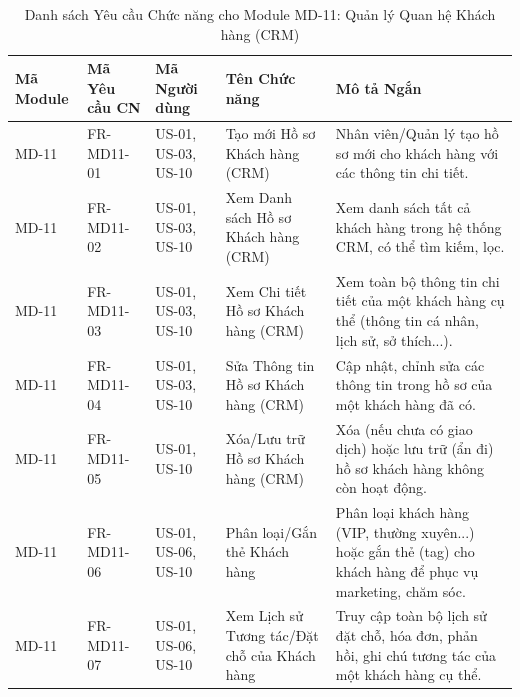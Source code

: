 \begin{longtable}{|m{2cm}|m{2.5cm}|m{2.5cm}|m{4.5cm}|m{4cm}|}
\caption{Danh sách Yêu cầu Chức năng cho Module MD-11: Quản lý Quan hệ Khách hàng (CRM)} \label{tab:fr_md11_crm_marketing_revised_in_codeblock} \\
\hline
\textbf{Mã Module} & \textbf{Mã Yêu cầu CN} & \textbf{Mã Người dùng} & \textbf{Tên Chức năng} & \textbf{Mô tả Ngắn} \\
\hline
\endhead %
\midrule
\endfoot %
\bottomrule
\endlastfoot %

MD-11 & FR-MD11-01 & US-01, US-03, US-10 & Tạo mới Hồ sơ Khách hàng (CRM) & Nhân viên/Quản lý tạo hồ sơ mới cho khách hàng với các thông tin chi tiết. \\
\hline
MD-11 & FR-MD11-02 & US-01, US-03, US-10 & Xem Danh sách Hồ sơ Khách hàng (CRM) & Xem danh sách tất cả khách hàng trong hệ thống CRM, có thể tìm kiếm, lọc. \\
\hline
MD-11 & FR-MD11-03 & US-01, US-03, US-10 & Xem Chi tiết Hồ sơ Khách hàng (CRM) & Xem toàn bộ thông tin chi tiết của một khách hàng cụ thể (thông tin cá nhân, lịch sử, sở thích...). \\
\hline
MD-11 & FR-MD11-04 & US-01, US-03, US-10 & Sửa Thông tin Hồ sơ Khách hàng (CRM) & Cập nhật, chỉnh sửa các thông tin trong hồ sơ của một khách hàng đã có. \\
\hline
MD-11 & FR-MD11-05 & US-01, US-10 & Xóa/Lưu trữ Hồ sơ Khách hàng (CRM) & Xóa (nếu chưa có giao dịch) hoặc lưu trữ (ẩn đi) hồ sơ khách hàng không còn hoạt động. \\
\hline
MD-11 & FR-MD11-06 & US-01, US-06, US-10 & Phân loại/Gắn thẻ Khách hàng & Phân loại khách hàng (VIP, thường xuyên...) hoặc gắn thẻ (tag) cho khách hàng để phục vụ marketing, chăm sóc. \\
\hline
MD-11 & FR-MD11-07 & US-01, US-06, US-10 & Xem Lịch sử Tương tác/Đặt chỗ của Khách hàng & Truy cập toàn bộ lịch sử đặt chỗ, hóa đơn, phản hồi, ghi chú tương tác của một khách hàng cụ thể. \\
\hline


\end{longtable}
